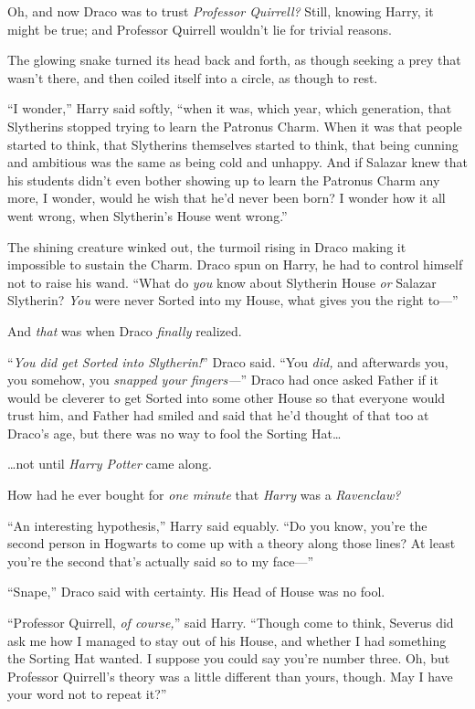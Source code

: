 Oh, and now Draco was to trust \emph{Professor Quirrell?} Still, knowing Harry, it might be true; and Professor Quirrell wouldn’t lie for trivial reasons.

The glowing snake turned its head back and forth, as though seeking a prey that wasn’t there, and then coiled itself into a circle, as though to rest.

“I wonder,” Harry said softly, “when it was, which year, which generation, that Slytherins stopped trying to learn the Patronus Charm. When it was that people started to think, that Slytherins themselves started to think, that being cunning and ambitious was the same as being cold and unhappy. And if Salazar knew that his students didn’t even bother showing up to learn the Patronus Charm any more, I wonder, would he wish that he’d never been born? I wonder how it all went wrong, when Slytherin’s House went wrong.”

The shining creature winked out, the turmoil rising in Draco making it impossible to sustain the Charm. Draco spun on Harry, he had to control himself not to raise his wand. “What do \emph{you} know about Slytherin House \emph{or} Salazar Slytherin? \emph{You} were never Sorted into my House, what gives you the right to—”

And \emph{that} was when Draco \emph{finally} realized.

“\emph{You did get Sorted into Slytherin!}” Draco said. “You \emph{did,} and afterwards you, you somehow, you \emph{snapped your fingers—}” Draco had once asked Father if it would be cleverer to get Sorted into some other House so that everyone would trust him, and Father had smiled and said that he’d thought of that too at Draco’s age, but there was no way to fool the Sorting Hat…

…not until \emph{Harry Potter} came along.

How had he ever bought for \emph{one minute} that \emph{Harry} was a \emph{Ravenclaw?}

“An interesting hypothesis,” Harry said equably. “Do you know, you’re the second person in Hogwarts to come up with a theory along those lines? At least you’re the second that’s actually said so to my face—”

“Snape,” Draco said with certainty. His Head of House was no fool.

“Professor Quirrell, \emph{of course,}” said Harry. “Though come to think, Severus did ask me how I managed to stay out of his House, and whether I had something the Sorting Hat wanted. I suppose you could say you’re number three. Oh, but Professor Quirrell’s theory was a little different than yours, though. May I have your word not to repeat it?”

